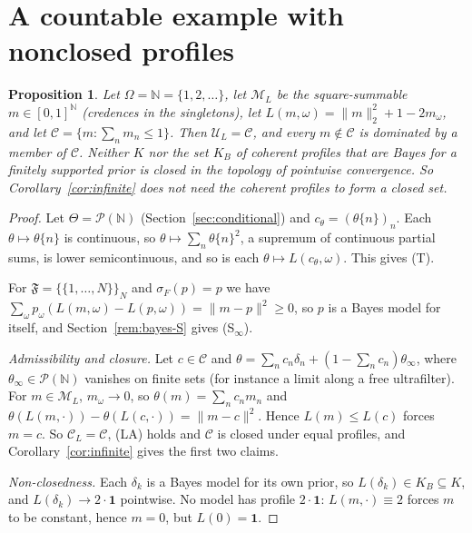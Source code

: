 \documentclass[11pt]{article}
\newtheorem{proposition}[theorem]{Proposition}
\theoremstyle{definition}
\theoremstyle{remark}
\newcommand{\M}{\mathcal M}
\newcommand{\C}{\mathcal C}
\newcommand{\F}{\mathfrak F}
\newcommand{\U}{\mathcal U}
\newcommand{\PP}{\mathcal P}
\newcommand{\one}{\mathbf 1}
\begin{document}
\section{A countable example with nonclosed profiles}\label{sec:countable}
\begin{proposition}\label{prop:countable}
Let $\Omega=\mathbb N=\{1,2,\dots\}$, let $\M_L$ be the square-summable $m\in[0,1]^{\mathbb N}$ (credences in the singletons), let $L(m,\omega)=\|m\|_2^2+1-2m_\omega$, and let $\C=\{m:\sum_nm_n\le1\}$. Then $\U_L=\C$, and every $m\notin\C$ is dominated by a member of $\C$. Neither $K$ nor the set $K_B$ of coherent profiles that are Bayes for a finitely supported prior is closed in the topology of pointwise convergence. So Corollary~\ref{cor:infinite} does not need the coherent profiles to form a closed set.
\end{proposition}
\begin{proof}
Let $\Theta=\PP(\mathbb N)$ (Section~\ref{sec:conditional}) and $c_\theta=(\theta\{n\})_n$. Each $\theta\mapsto\theta\{n\}$ is continuous, so $\theta\mapsto\sum_n\theta\{n\}^2$, a supremum of continuous partial sums, is lower semicontinuous, and so is each $\theta\mapsto L(c_\theta,\omega)$. This gives (T).

For $\F=\{\{1,\dots,N\}\}_N$ and $\sigma_F(p)=p$ we have $\sum_\omega p_\omega(L(m,\omega)-L(p,\omega))=\|m-p\|^2\ge0$, so $p$ is a Bayes model for itself, and Section~\ref{rem:bayes-S} gives (S$_\infty$).

\emph{Admissibility and closure.} Let $c\in\C$ and $\theta=\sum_nc_n\delta_n+(1-\sum_nc_n)\theta_\infty$, where $\theta_\infty\in\PP(\mathbb N)$ vanishes on finite sets (for instance a limit along a free ultrafilter). For $m\in\M_L$, $m_\omega\to0$, so $\theta(m)=\sum_nc_nm_n$ and $\theta(L(m,\cdot))-\theta(L(c,\cdot))=\|m-c\|^2$. Hence $L(m)\le L(c)$ forces $m=c$. So $\C_L=\C$, (LA) holds and $\C$ is closed under equal profiles, and Corollary~\ref{cor:infinite} gives the first two claims.

\emph{Non-closedness.} Each $\delta_k$ is a Bayes model for its own prior, so $L(\delta_k)\in K_B\subseteq K$, and $L(\delta_k)\to2\cdot\one$ pointwise. No model has profile $2\cdot\one$: $L(m,\cdot)\equiv2$ forces $m$ to be constant, hence $m=0$, but $L(0)=\one$.
\end{proof}
\end{document}

